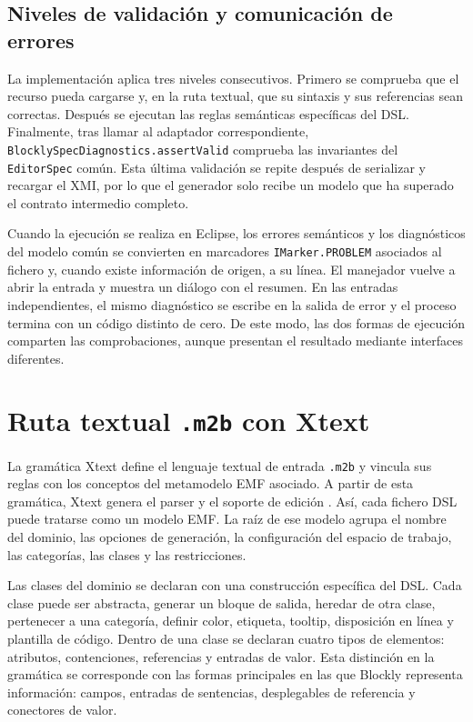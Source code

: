 \subsection{Niveles de validación y comunicación de errores}

La implementación aplica tres niveles consecutivos. Primero se comprueba que el
recurso pueda cargarse y, en la ruta textual, que su sintaxis y sus referencias
sean correctas. Después se ejecutan las reglas semánticas específicas del DSL.
Finalmente, tras llamar al adaptador correspondiente,
\texttt{BlocklySpecDiagnostics.assertValid} comprueba las invariantes del
\texttt{EditorSpec} común. Esta última validación se repite después de serializar
y recargar el XMI, por lo que el generador solo recibe un modelo que ha superado
el contrato intermedio completo.

Cuando la ejecución se realiza en Eclipse, los errores semánticos y los
diagnósticos del modelo común se convierten en marcadores
\texttt{IMarker.PROBLEM} asociados al fichero y, cuando existe información de
origen, a su línea. El manejador vuelve a abrir la entrada y muestra un diálogo con
el resumen. En las entradas independientes, el mismo diagnóstico se escribe en la
salida de error y el proceso termina con un código distinto de cero. De este
modo, las dos formas de ejecución comparten las comprobaciones, aunque presentan
el resultado mediante interfaces diferentes.

\section{Ruta textual \texttt{.m2b} con Xtext}
\label{sec:implementacion-xtext}

La gramática Xtext define el lenguaje textual de entrada \texttt{.m2b} y
vincula sus reglas con los conceptos del metamodelo EMF asociado. A partir de
esta gramática, Xtext genera el parser y el soporte de edición
\cite{xtextProject,bettini2013xtext,bettini2015xsemantics}. Así, cada fichero
DSL puede tratarse como un modelo EMF. La raíz de ese modelo agrupa el nombre
del dominio, las opciones de generación, la configuración del espacio de trabajo, las
categorías, las clases y las restricciones.

Las clases del dominio se declaran con una construcción específica del DSL. Cada
clase puede ser abstracta, generar un bloque de salida, heredar de otra clase,
pertenecer a una categoría, definir color, etiqueta, tooltip, disposición en
línea y plantilla de código. Dentro de una clase se declaran cuatro tipos de
elementos: atributos, contenciones, referencias y entradas de valor. Esta
distinción en la gramática se corresponde con las formas principales en las que
Blockly representa información: campos, entradas de sentencias, desplegables de
referencia y conectores de valor.

